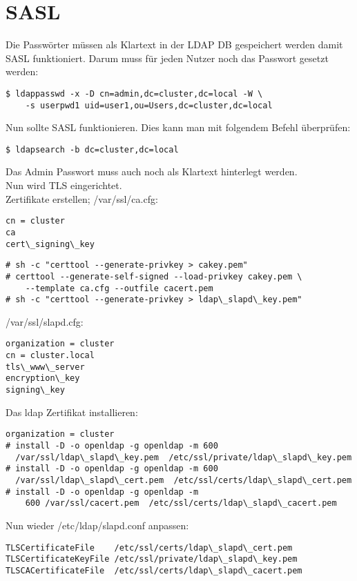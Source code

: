 \section{SASL}
Die Passwörter müssen als Klartext in der LDAP DB gespeichert werden damit SASL funktioniert. Darum muss für jeden Nutzer noch das Passwort gesetzt werden:
\begin{lstlisting}[style=Bash]
$ ldappasswd -x -D cn=admin,dc=cluster,dc=local -W \
	-s userpwd1 uid=user1,ou=Users,dc=cluster,dc=local 
\end{lstlisting}
Nun sollte SASL funktionieren. Dies kann man mit folgendem Befehl überprüfen:
\begin{lstlisting}[style=Bash]
$ ldapsearch -b dc=cluster,dc=local
\end{lstlisting}
Das Admin Passwort muss auch noch als Klartext hinterlegt werden.\\
Nun wird TLS eingerichtet.\\
Zertifikate erstellen; /var/ssl/ca.cfg:
\begin{lstlisting}[style=Bash]
cn = cluster
ca
cert\_signing\_key
\end{lstlisting}
\begin{lstlisting}[style=Bash]
# sh -c "certtool --generate-privkey > cakey.pem" 
# certtool --generate-self-signed --load-privkey cakey.pem \
	--template ca.cfg --outfile cacert.pem 
# sh -c "certtool --generate-privkey > ldap\_slapd\_key.pem"
\end{lstlisting}
/var/ssl/slapd.cfg:
\begin{lstlisting}[style=Bash]
organization = cluster
cn = cluster.local
tls\_www\_server
encryption\_key
signing\_key
\end{lstlisting}
Das ldap Zertifikat installieren:
\begin{lstlisting}[style=Bash]
organization = cluster
# install -D -o openldap -g openldap -m 600 
  /var/ssl/ldap\_slapd\_key.pem  /etc/ssl/private/ldap\_slapd\_key.pem
# install -D -o openldap -g openldap -m 600 
  /var/ssl/ldap\_slapd\_cert.pem  /etc/ssl/certs/ldap\_slapd\_cert.pem
# install -D -o openldap -g openldap -m 
    600 /var/ssl/cacert.pem  /etc/ssl/certs/ldap\_slapd\_cacert.pem 
\end{lstlisting}
Nun wieder /etc/ldap/slapd.conf anpassen:
\begin{lstlisting}[style=Bash]
TLSCertificateFile    /etc/ssl/certs/ldap\_slapd\_cert.pem
TLSCertificateKeyFile /etc/ssl/private/ldap\_slapd\_key.pem
TLSCACertificateFile  /etc/ssl/certs/ldap\_slapd\_cacert.pem
\end{lstlisting}
